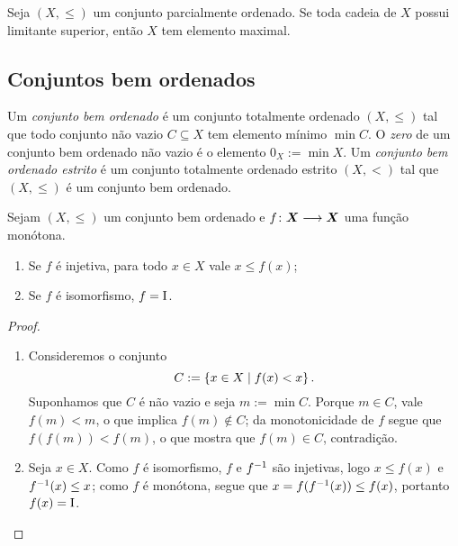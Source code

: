 \begin{lema}
	Seja $(X,\leq)$ um conjunto parcialmente ordenado. Se toda cadeia de $X$ possui limitante superior, então $X$ tem elemento maximal.
\end{lema}



\subsection{Conjuntos bem ordenados}

\begin{definition}
Um \emph{conjunto bem ordenado} é um conjunto totalmente ordenado $(X,\leq)$ tal que todo conjunto não vazio $C \subseteq X$ tem elemento mínimo $\min C$. O \emph{zero} de um conjunto bem ordenado não vazio é o elemento $0_X := \min X$. Um \emph{conjunto bem ordenado estrito} é um conjunto totalmente ordenado estrito $(X,<)$ tal que $(X,\leq)$ é um conjunto bem ordenado.
\end{definition}

\begin{proposition}
	Sejam $(X,\leq)$ um conjunto bem ordenado e ${f}\colon {\bm X} \longrightarrow {\bm X}$ uma função monótona.
		\begin{enumerate}
			\item Se $f$ é injetiva, para todo $x \in X$ vale $x \leq f(x)$;
			\item Se $f$ é isomorfismo, $f=\mathrm{I}$.
		\end{enumerate}
\end{proposition}
\begin{proof}
	\begin{enumerate}
		\item Consideremos o conjunto
			\begin{equation*}
				C := \left\{{x \in X}\;\middle\vert\;{f(x)<x}\right\}.
			\end{equation*}
		Suponhamos que $C$ é não vazio e seja $m := \min C$. Porque $m \in C$, vale $f(m) < m$, o que implica $f(m) \notin C$; da monotonicidade de $f$ segue que $f(f(m)) < f(m)$, o que mostra que $f(m) \in C$, contradição.

		\item Seja $x \in X$. Como $f$ é isomorfismo, $f$ e $f^{-1}$ são injetivas, logo $x \leq f(x)$ e $f^{-1}(x) \leq x$; como $f$ é monótona, segue que $x = f(f^{-1}(x)) \leq f(x)$, portanto $f(x) = \mathrm{I}$.
	\end{enumerate}
\end{proof}

